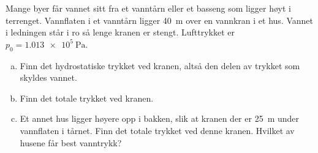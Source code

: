 %
Mange byer får vannet sitt fra et vanntårn eller et basseng som ligger høyt i terrenget. Vannflaten i et vanntårn ligger \SI{40}{\metre} over en vannkran i et hus. Vannet i ledningen står i ro så lenge kranen er stengt. Lufttrykket er $p_0 = \SI{1.013e5}{\pascal}$.
\begin{enumerate}[a)]
    \item Finn det hydrostatiske trykket ved kranen, altså den delen av trykket som skyldes vannet.
    \item Finn det totale trykket ved kranen.
    \item Et annet hus ligger høyere opp i bakken, slik at kranen der er \SI{25}{\metre} under vannflaten i tårnet. Finn det totale trykket ved denne kranen. Hvilket av husene får best vanntrykk?
\end{enumerate}
%

